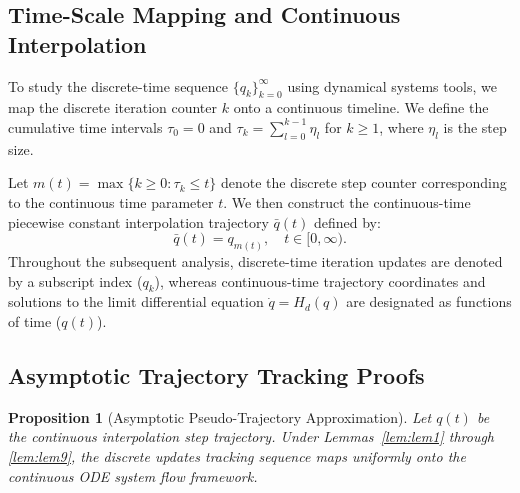 \documentclass[11pt,a4paper]{article}
\newtheorem{proposition}{Proposition}
\theoremstyle{definition}
\begin{document}
\subsection{Time-Scale Mapping and Continuous Interpolation}
To study the discrete-time sequence $\{q_k\}_{k=0}^{\infty}$ using dynamical systems tools, we map the discrete iteration counter $k$ onto a continuous timeline. We define the cumulative time intervals $\tau_0 = 0$ and $\tau_k = \sum_{l=0}^{k-1} \eta_l$ for $k \ge 1$, where $\eta_l$ is the step size. 

Let $m(t) = \max\{k \ge 0 : \tau_k \le t\}$ denote the discrete step counter corresponding to the continuous time parameter $t$. We then construct the continuous-time piecewise constant interpolation trajectory $\bar{q}(t)$ defined by:
\begin{equation}
    \bar{q}(t) = q_{m(t)}, \quad t \in [0, \infty).
\end{equation}
Throughout the subsequent analysis, discrete-time iteration updates are denoted by a subscript index ($q_k$), whereas continuous-time trajectory coordinates and solutions to the limit differential equation $\dot{q} = H_d(q)$ are designated as functions of time ($q(t)$).
\subsection{Asymptotic Trajectory Tracking Proofs}

\begin{proposition}[Asymptotic Pseudo-Trajectory Approximation] \label{prop:tracking}
Let $q(t)$ be the continuous interpolation step trajectory. Under Lemmas~\ref{lem:lem1} through \ref{lem:lem9}, the discrete updates tracking sequence maps uniformly onto the continuous ODE system flow framework.
\end{proposition}
\end{document}
